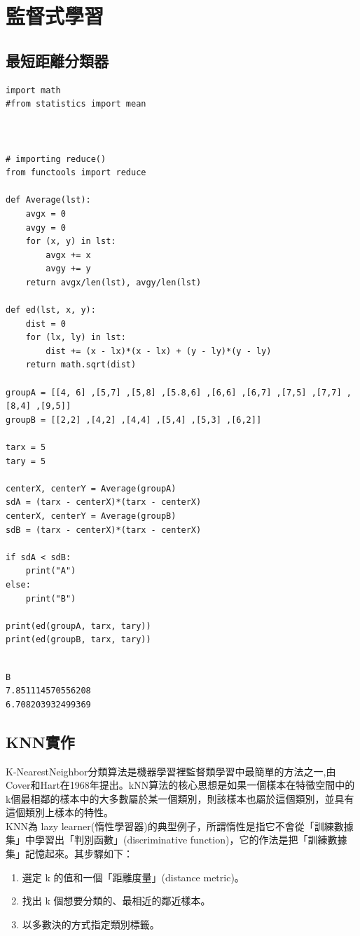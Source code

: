 \documentclass[a4paper,12pt]{article}
\begin{document}
\section{監督式學習}
\label{sec:org3774e52}
\subsection{最短距離分類器}
\label{sec:org51a21a5}
\lstset{breaklines=true,language=Python,label= ,caption= ,captionpos=b,firstnumber=1,numbers=left}
\begin{lstlisting}
import math
#from statistics import mean



# importing reduce()
from functools import reduce

def Average(lst):
    avgx = 0
    avgy = 0
    for (x, y) in lst:
        avgx += x
        avgy += y
    return avgx/len(lst), avgy/len(lst)

def ed(lst, x, y):
    dist = 0
    for (lx, ly) in lst:
        dist += (x - lx)*(x - lx) + (y - ly)*(y - ly)
    return math.sqrt(dist)

groupA = [[4, 6] ,[5,7] ,[5,8] ,[5.8,6] ,[6,6] ,[6,7] ,[7,5] ,[7,7] ,[8,4] ,[9,5]]
groupB = [[2,2] ,[4,2] ,[4,4] ,[5,4] ,[5,3] ,[6,2]]

tarx = 5
tary = 5

centerX, centerY = Average(groupA)
sdA = (tarx - centerX)*(tarx - centerX)
centerX, centerY = Average(groupB)
sdB = (tarx - centerX)*(tarx - centerX)

if sdA < sdB:
    print("A")
else:
    print("B")

print(ed(groupA, tarx, tary))
print(ed(groupB, tarx, tary))


\end{lstlisting}

\begin{verbatim}
B
7.851114570556208
6.708203932499369
\end{verbatim}

\subsection{KNN實作}
\label{sec:orge1334df}
K-NearestNeighbor分類算法是機器學習裡監督類學習中最簡單的方法之一,由Cover和Hart在1968年提出。kNN算法的核心思想是如果一個樣本在特徵空間中的k個最相鄰的樣本中的大多數屬於某一個類別，則該樣本也屬於這個類別，並具有這個類別上樣本的特性。\\

KNN為 lazy learner(惰性學習器)的典型例子，所謂惰性是指它不會從「訓練數據集」中學習出「判別函數」(discriminative function)，它的作法是把「訓練數據集」記憶起來。其步驟如下：\\
\begin{enumerate}
\item 選定 k 的值和一個「距離度量」(distance metric)。\\
\item 找出 k 個想要分類的、最相近的鄰近樣本。\\
\item 以多數決的方式指定類別標籤。\\
\end{enumerate}
\end{document}
